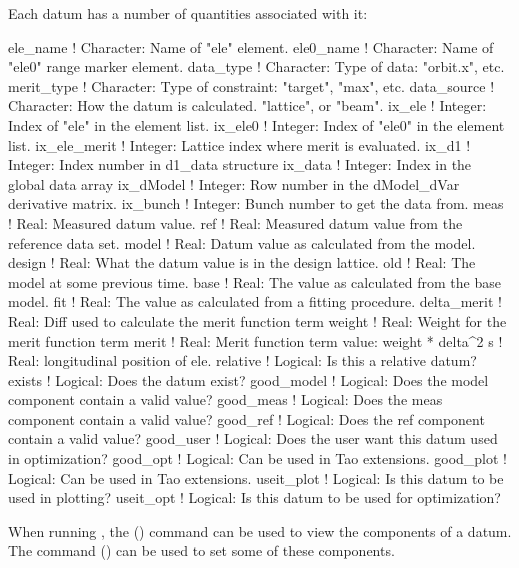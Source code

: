 Each datum has a number of quantities associated with it:
\begin{example}
  ele_name       ! Character: Name of "ele" element.
  ele0_name      ! Character: Name of "ele0" range marker element.
  data_type      ! Character: Type of data: "orbit.x", etc.
  merit_type     ! Character: Type of constraint: "target", "max", etc.
  data_source    ! Character: How the datum is calculated. "lattice", or "beam".
  ix_ele            ! Integer: Index of "ele" in the element list.
  ix_ele0           ! Integer: Index of "ele0" in the element list.
  ix_ele_merit      ! Integer: Lattice index where merit is evaluated.
  ix_d1             ! Integer: Index number in d1_data structure
  ix_data           ! Integer: Index in the global data array
  ix_dModel         ! Integer: Row number in the dModel_dVar derivative matrix.
  ix_bunch          ! Integer: Bunch number to get the data from.
  meas              ! Real: Measured datum value. 
  ref               ! Real: Measured datum value from the reference data set.
  model             ! Real: Datum value as calculated from the model.
  design            ! Real: What the datum value is in the design lattice.
  old               ! Real: The model at some previous time.
  base              ! Real: The value as calculated from the base model.
  fit               ! Real: The value as calculated from a fitting procedure.
  delta_merit       ! Real: Diff used to calculate the merit function term 
  weight            ! Real: Weight for the merit function term
  merit             ! Real: Merit function term value: weight * delta^2
  s                 ! Real: longitudinal position of ele.
  relative          ! Logical: Is this a relative datum?
  exists            ! Logical: Does the datum exist?
  good_model        ! Logical: Does the model component contain a valid value?
  good_meas         ! Logical: Does the meas component contain a valid value?
  good_ref          ! Logical: Does the ref component contain a valid value?
  good_user         ! Logical: Does the user want this datum used in optimization?
  good_opt          ! Logical: Can be used in Tao extensions.
  good_plot         ! Logical: Can be used in Tao extensions.
  useit_plot        ! Logical: Is this datum to be used in plotting?
  useit_opt         ! Logical: Is this datum to be used for optimization?
\end{example}
When running \tao, the 
() command can be used to view the components of a datum. 
The  command () can be used to set some of these components.

